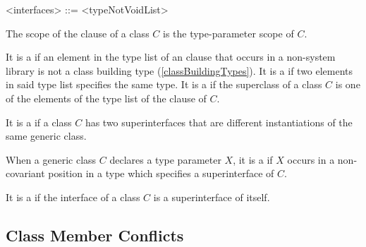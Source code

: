 \documentclass[makeidx]{article}
\begin{document}
\begin{grammar}
<interfaces> ::= \IMPLEMENTS{} <typeNotVoidList>
\end{grammar}

\LMHash{}%
The scope of the \IMPLEMENTS{} clause of a class $C$ is
the type-parameter scope of $C$.

\LMHash{}%
It is a  if an element
in the type list of an \IMPLEMENTS{} clause
that occurs in a non-system library
is not a class building type
(\ref{classBuildingTypes}).
It is a  if two elements in said type list
specifies the same type.
It is a  if the superclass of a class $C$ is
one of the elements of the type list of the \IMPLEMENTS{} clause of $C$.


\LMHash{}%
It is a  if a class $C$ has two superinterfaces
that are different instantiations of the same generic class.

\LMHash{}%
When a generic class $C$ declares a type parameter $X$,
it is a  if $X$ occurs in a non-covariant position
in a type which specifies a superinterface of $C$.

\LMHash{}%
It is a  if the interface of a class $C$ is
a superinterface of itself.



\subsection{Class Member Conflicts}
\end{document}

